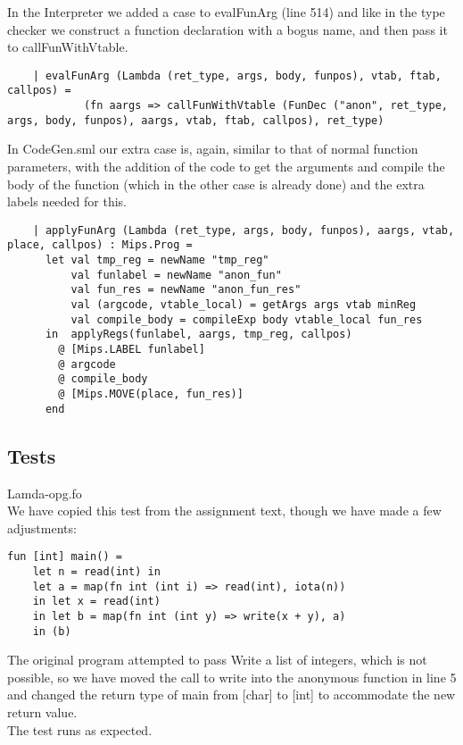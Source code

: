 \documentclass{article}
\begin{document}
\noindent In the Interpreter we added a case to evalFunArg (line 514) and like in the type checker we construct a function declaration with a bogus name, and then pass it to callFunWithVtable.

\begin{lstlisting}
    | evalFunArg (Lambda (ret_type, args, body, funpos), vtab, ftab, callpos) =
            (fn aargs => callFunWithVtable (FunDec ("anon", ret_type, args, body, funpos), aargs, vtab, ftab, callpos), ret_type)
\end{lstlisting}

\noindent In CodeGen.sml our extra case is, again, similar to that of normal function parameters, with the addition of the code to get the arguments and compile the body of the function (which in the other case is already done) and the extra labels needed for this.

\begin{lstlisting}
    | applyFunArg (Lambda (ret_type, args, body, funpos), aargs, vtab, place, callpos) : Mips.Prog =
      let val tmp_reg = newName "tmp_reg"
          val funlabel = newName "anon_fun"
          val fun_res = newName "anon_fun_res"
          val (argcode, vtable_local) = getArgs args vtab minReg
          val compile_body = compileExp body vtable_local fun_res
      in  applyRegs(funlabel, aargs, tmp_reg, callpos)
        @ [Mips.LABEL funlabel]
        @ argcode
        @ compile_body
        @ [Mips.MOVE(place, fun_res)]
      end
\end{lstlisting}

\subsection{Tests}

Lamda-opg.fo\\
We have copied this test from the assignment text, though we have made a few adjustments:
\begin{lstlisting}
fun [int] main() = 
	let n = read(int) in 
	let a = map(fn int (int i) => read(int), iota(n)) 
	in let x = read(int) 
	in let b = map(fn int (int y) => write(x + y), a) 
	in (b)
\end{lstlisting}
\noindent The original program attempted to pass Write a list of integers, which is not possible, so we have moved the call to write into the anonymous function in line 5 and changed the return type of main from [char] to [int] to accommodate the new return value.\\
The test runs as expected.
\end{document}

